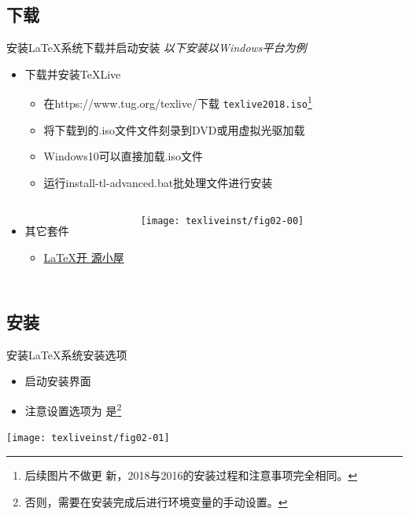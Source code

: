 \documentclass[xcolor=svgnames, t, aspectratio=169]{ctexbeamer}
\begin{document}
\subsection[下载]{下载}
\begin{frame}[t]{安装\LaTeX 系统}{下载并启动安装}
  \stretchon
  \emph{以下安装以Windows平台为例}
  \begin{itemize}
  \item 下载并安装\TeX Live
    \begin{itemize}
    \item 在\url{}{https://www.tug.org/texlive/}下载
      \texttt{texlive2018.iso}\footnote[frame]{后续图片不做更
        新，2018与2016的安装过程和注意事项完全相同。}
    \item 将下载到的.iso文件文件刻录到DVD或用虚拟光驱加载
    \item Windows10可以\alert{直接加载}.iso文件
    \item 运行install-tl-advanced.bat批处理文件进行安装
    \end{itemize}
  \end{itemize}
  \vspace{-3ex}
  \begin{columns}[T]
  \begin{itemize}  
  \item 其它套件
    \begin{itemize}
    \item \href{http://www.latexstudio.net/page/texsoftware}{\LaTeX 开
        源小屋}
    \end{itemize}
  \end{itemize}
  \centering%
  \texttt{[image: texliveinst/fig02-00]}
  \end{columns}
  \stretchoff
\end{frame}
\subsection[安装]{安装}
\begin{frame}[t]{安装\LaTeX 系统}{安装选项}
  \begin{itemize}
  \item 启动安装界面
  \item 注意设置选项为
    \alert{是}\footnote[frame]{否则，需要在安装完成后进行环境变量的手动设置。}
  \end{itemize}
  \centering
  \texttt{[image: texliveinst/fig02-01]}
\end{frame}
\end{document}
